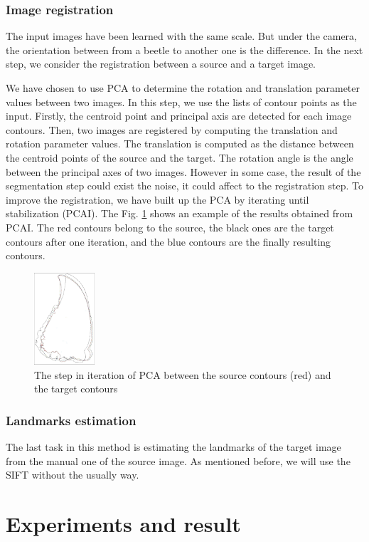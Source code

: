 \documentclass{gretsi}
\begin{document}
\subsubsection{Image registration}
The input images have been learned with the same scale. But under the camera, the orientation between from a beetle to another one is the difference. In the next step, we consider the registration between a source and a target image.

We have chosen to use PCA \cite{} to determine the rotation and translation parameter values between two images. In this step, we use the lists of contour points as the input. Firstly, the centroid point and principal axis are detected for each image contours. Then, two images are registered by computing the translation and rotation parameter values. The translation is computed as the distance between the centroid points of the source and the target. The rotation angle is the angle between the principal axes of two images. However in some case, the result of the segmentation step could exist the noise, it could affect to the registration step. To improve the registration, we have built up the PCA by iterating until stabilization (PCAI). The Fig. \ref{} shows an example of the results obtained from PCAI. The red contours belong to the source, the black ones are the target contours after one iteration, and the blue contours are the finally resulting contours.
\begin{figure}[htb]
    \centering
    \includegraphics[width=0.2\textwidth]{./images/imreg}
    \caption{The step in iteration of PCA between the source contours (red) and the target contours}
    \label{fig5}
\end{figure}
\subsubsection{Landmarks estimation}
The last task in this method is estimating the landmarks of the target image from the manual one of the source image. As mentioned before, we will use the SIFT \cite{*} without the usually way.
\section{Experiments and result}
\end{document}
